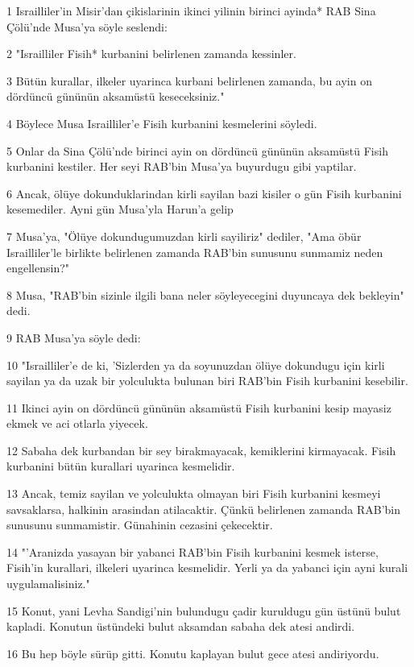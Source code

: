 \par 1 Israilliler'in Misir'dan çikislarinin ikinci yilinin birinci ayinda* RAB Sina Çölü'nde Musa'ya söyle seslendi:
\par 2 "Israilliler Fisih* kurbanini belirlenen zamanda kessinler.
\par 3 Bütün kurallar, ilkeler uyarinca kurbani belirlenen zamanda, bu ayin on dördüncü gününün aksamüstü keseceksiniz."
\par 4 Böylece Musa Israilliler'e Fisih kurbanini kesmelerini söyledi.
\par 5 Onlar da Sina Çölü'nde birinci ayin on dördüncü gününün aksamüstü Fisih kurbanini kestiler. Her seyi RAB'bin Musa'ya buyurdugu gibi yaptilar.
\par 6 Ancak, ölüye dokunduklarindan kirli sayilan bazi kisiler o gün Fisih kurbanini kesemediler. Ayni gün Musa'yla Harun'a gelip
\par 7 Musa'ya, "Ölüye dokundugumuzdan kirli sayiliriz" dediler, "Ama öbür Israilliler'le birlikte belirlenen zamanda RAB'bin sunusunu sunmamiz neden engellensin?"
\par 8 Musa, "RAB'bin sizinle ilgili bana neler söyleyecegini duyuncaya dek bekleyin" dedi.
\par 9 RAB Musa'ya söyle dedi:
\par 10 "Israilliler'e de ki, 'Sizlerden ya da soyunuzdan ölüye dokundugu için kirli sayilan ya da uzak bir yolculukta bulunan biri RAB'bin Fisih kurbanini kesebilir.
\par 11 Ikinci ayin on dördüncü gününün aksamüstü Fisih kurbanini kesip mayasiz ekmek ve aci otlarla yiyecek.
\par 12 Sabaha dek kurbandan bir sey birakmayacak, kemiklerini kirmayacak. Fisih kurbanini bütün kurallari uyarinca kesmelidir.
\par 13 Ancak, temiz sayilan ve yolculukta olmayan biri Fisih kurbanini kesmeyi savsaklarsa, halkinin arasindan atilacaktir. Çünkü belirlenen zamanda RAB'bin sunusunu sunmamistir. Günahinin cezasini çekecektir.
\par 14 "'Aranizda yasayan bir yabanci RAB'bin Fisih kurbanini kesmek isterse, Fisih'in kurallari, ilkeleri uyarinca kesmelidir. Yerli ya da yabanci için ayni kurali uygulamalisiniz."
\par 15 Konut, yani Levha Sandigi'nin bulundugu çadir kuruldugu gün üstünü bulut kapladi. Konutun üstündeki bulut aksamdan sabaha dek atesi andirdi.
\par 16 Bu hep böyle sürüp gitti. Konutu kaplayan bulut gece atesi andiriyordu.

